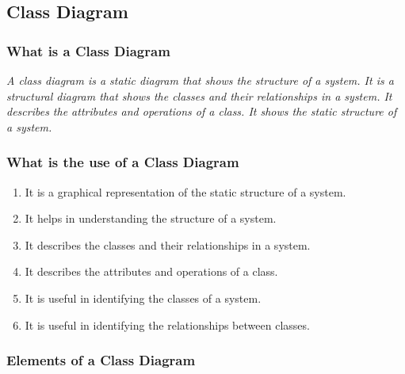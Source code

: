 \documentclass[11pt]{article}
\begin{document}
\subsection{Class Diagram}

\subsubsection{What is a Class Diagram}

\textit{A class diagram is a static diagram that shows the structure of a system. It is a structural diagram that shows the classes and their relationships in a system. It describes the attributes and operations of a class. It shows the static structure of a system.}

\subsubsection{What is the use of a Class Diagram}

\begin{enumerate}
	\item It is a graphical representation of the static structure of a system.
	\item It helps in understanding the structure of a system.
	\item It describes the classes and their relationships in a system.
	\item It describes the attributes and operations of a class.
	\item It is useful in identifying the classes of a system.
	\item It is useful in identifying the relationships between classes.
\end{enumerate}

\subsubsection{Elements of a Class Diagram}
\end{document}
